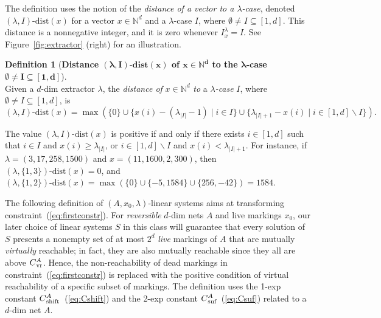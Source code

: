\documentclass[11pt,a4paper]{amsart}
\newcommand{\dist}[3]{(#1,#2)\text{-dist}(#3)}
\newcommand{\vr}{{}_\textnormal{vr}}
\newcommand{\suf}{{}_\textnormal{suf}}
\newcommand{\shift}{{}_\textnormal{shift}}
\newcommand{\Nat}{\mathbb{N}}
\newcommand{\setN}{\Nat}
\theoremstyle{plain}
\theoremstyle{definition}
\newtheorem{defi}[thm]{Definition}
\theoremstyle{defC}
\theoremstyle{thmC}
\begin{document}
The definition uses the notion of the \emph{distance of a vector to a
$\lambda$-case}, denoted $\dist{\lambda}{I}{x}$ for a vector
$x\in\setN^d$ and a $\lambda$-case $I$, where
$\emptyset\neq I\subseteq[1,d]$.
This distance is a nonnegative integer, and it is zero whenever
$I^\lambda_x=I$.
See Figure~\ref{fig:extractor} (right) for an illustration.


\begin{defi}[\textbf{Distance $\bm{\dist{\lambda}{I}{x}}$ of $\bm{x\in\setN^d}$ to the
	$\bm{\lambda}$-case $\bm{\emptyset\neq I\subseteq[1,d]}$}]
\hfill\\
Given a $d$-dim extractor $\lambda$, the \emph{distance of}
	$x\in\setN^d$ \emph{to} a \emph{$\lambda$-case} $I$, where
	$\emptyset\neq I\subseteq
[1,d]$, is 
	\[\dist{\lambda}{I}{x}=\max\left(\{0\}\cup
	\{x(i)-(\lambda_{|I|}-1)\mid i\in
I\}\cup\{\lambda_{|I|+1}-x(i)\mid i\in[1,d]\smallsetminus I\}\right).\]
\end{defi}	

\noindent
The value $\dist{\lambda}{I}{x}$ is positive if
and only if there exists
$i\in [1,d]$ such that $i\in I$ and $x(i)\geq \lambda_{|I|}$, or
$i\in[1,d]\smallsetminus I$ and $x(i)<\lambda_{|I|+1}$.
For instance, if $\lambda=(3,17,258,1500)$ and $x=(11,1600,2,300)$,
then $\dist{\lambda}{\{1,3\}}{x}=0$, 
and
$\dist{\lambda}{\{1,2\}}{x}=\max(\{0\}\cup\{-5,1584\}\cup\{256,-42\})=1584$. 

\smallskip

The following definition of $(A,x_0,\lambda)$-linear systems aims at
transforming
 constraint~(\ref{eq:firstconstr}). 
For  \emph{reversible} $d$-dim nets $A$ and live 
markings $x_0$, 
our later choice of linear systems $S$
in this class will guarantee that 
every solution of $S$ presents
a nonempty set of at most $2^d$ \emph{live} markings of $A$ that are mutually \emph{virtually} reachable; in
fact, they are also mutually reachable since they all are above $C\vr^A$.
Hence, the non-reachability of dead markings in 
constraint~(\ref{eq:firstconstr}) is replaced with the positive
condition of virtual reachability of a specific subset of markings. 
The definition uses the 1-exp constant $C\shift^A$~(\ref{eq:Cshift}) and the 2-exp
constant $C\suf^A$~(\ref{eq:Csuf}) 
related to a $d$-dim
net $A$.
\end{document}
